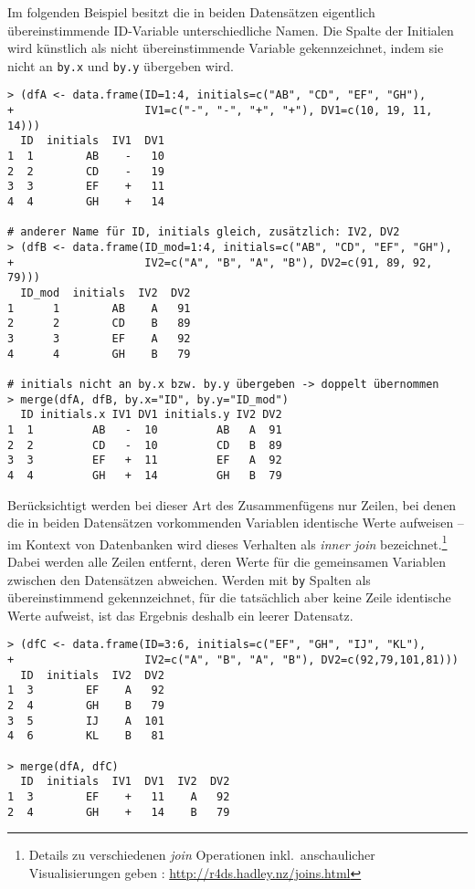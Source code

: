 Im folgenden Beispiel besitzt die in beiden Datensätzen eigentlich übereinstimmende ID-Variable unterschiedliche Namen. Die Spalte der Initialen wird künstlich als nicht übereinstimmende Variable gekennzeichnet, indem sie nicht an \lstinline!by.x! und \lstinline!by.y! übergeben wird.
\begin{lstlisting}
> (dfA <- data.frame(ID=1:4, initials=c("AB", "CD", "EF", "GH"),
+                    IV1=c("-", "-", "+", "+"), DV1=c(10, 19, 11, 14)))
  ID  initials  IV1  DV1
1  1        AB    -   10
2  2        CD    -   19
3  3        EF    +   11
4  4        GH    +   14

# anderer Name für ID, initials gleich, zusätzlich: IV2, DV2
> (dfB <- data.frame(ID_mod=1:4, initials=c("AB", "CD", "EF", "GH"),
+                    IV2=c("A", "B", "A", "B"), DV2=c(91, 89, 92, 79)))
  ID_mod  initials  IV2  DV2
1      1        AB    A   91
2      2        CD    B   89
3      3        EF    A   92
4      4        GH    B   79

# initials nicht an by.x bzw. by.y übergeben -> doppelt übernommen
> merge(dfA, dfB, by.x="ID", by.y="ID_mod")
  ID initials.x IV1 DV1 initials.y IV2 DV2
1  1         AB   -  10         AB   A  91
2  2         CD   -  10         CD   B  89
3  3         EF   +  11         EF   A  92
4  4         GH   +  14         GH   B  79
\end{lstlisting}

Berücksichtigt werden bei dieser Art des Zusammenfügens nur Zeilen, bei denen die in beiden Datensätzen vorkommenden Variablen identische Werte aufweisen -- im Kontext von Datenbanken wird dieses Verhalten als \emph{inner join} bezeichnet.\footnote{\label{ftn:join}Details zu verschiedenen \emph{join} Operationen inkl.\ anschaulicher Visualisierungen geben : \url{http://r4ds.hadley.nz/joins.html}} Dabei werden alle Zeilen entfernt, deren Werte für die gemeinsamen Variablen zwischen den Datensätzen abweichen. Werden mit \lstinline!by! Spalten als übereinstimmend gekennzeichnet, für die tatsächlich aber keine Zeile identische Werte aufweist, ist das Ergebnis deshalb ein leerer Datensatz.
\begin{lstlisting}
> (dfC <- data.frame(ID=3:6, initials=c("EF", "GH", "IJ", "KL"),
+                    IV2=c("A", "B", "A", "B"), DV2=c(92,79,101,81)))
  ID  initials  IV2  DV2
1  3        EF    A   92
2  4        GH    B   79
3  5        IJ    A  101
4  6        KL    B   81

> merge(dfA, dfC)
  ID  initials  IV1  DV1  IV2  DV2
1  3        EF    +   11    A   92
2  4        GH    +   14    B   79
\end{lstlisting}


